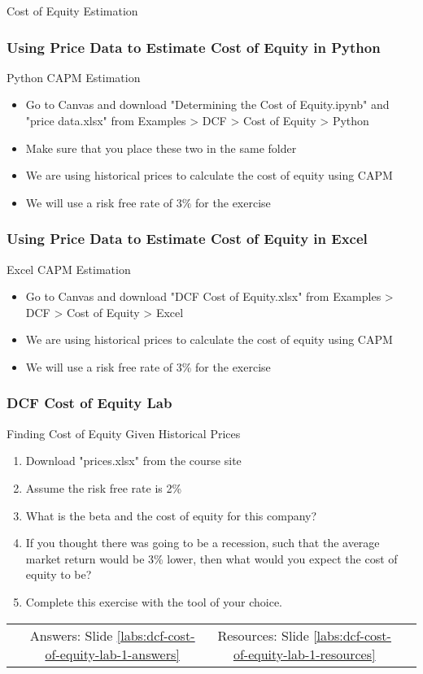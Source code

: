 \documentclass[handout, 11pt]{beamer}
\begin{document}
\begin{section}[Equity]{Cost of Equity Estimation}
\begin{frame}
\end{frame}
\begin{frame}
\frametitle{Using Price Data to Estimate Cost of Equity in Python}
{
\begin{block}{Python CAPM Estimation}
\begin{itemize}
\item Go to Canvas and download "Determining the Cost of Equity.ipynb" and "price data.xlsx" from Examples > DCF > Cost of Equity > Python
\item Make sure that you place these two in the same folder
\item We are using historical prices to calculate the cost of equity using CAPM
\item We will use a risk free rate of 3\% for the exercise
\end{itemize}
\end{block}
}
\end{frame}
\begin{frame}
\frametitle{Using Price Data to Estimate Cost of Equity in Excel}
{
\begin{block}{Excel CAPM Estimation}
\begin{itemize}
\item Go to Canvas and download "DCF Cost of Equity.xlsx" from Examples > DCF > Cost of Equity > Excel
\item We are using historical prices to calculate the cost of equity using CAPM
\item We will use a risk free rate of 3\% for the exercise
\end{itemize}
\end{block}
}
\end{frame}
\begin{frame}
\frametitle{DCF Cost of Equity Lab}
{
\begin{block}{Finding Cost of Equity Given Historical Prices}
\begin{enumerate}
\item Download "prices.xlsx" from the course site
\item Assume the risk free rate is 2\%
\item What is the beta and the cost of equity for this company?
\item If you thought there was going to be a recession, such that the average market return would be 3\% lower, then what would you expect the cost of equity to be?
\item Complete this exercise with the tool of your choice.
\end{enumerate}
\vfill
\begin{tabular*}{\textwidth}{@{\extracolsep{\fill}}cccc}
\toprule
\hfill & Answers: Slide \textcolor{blue}{\underline{\ref{labs:dcf-cost-of-equity-lab-1-answers}}} & Resources: Slide \textcolor{blue}{\underline{\ref{labs:dcf-cost-of-equity-lab-1-resources}}} & \hfill\\


\end{tabular*}
\end{block}}
\end{frame}
\end{section}
\end{document}
